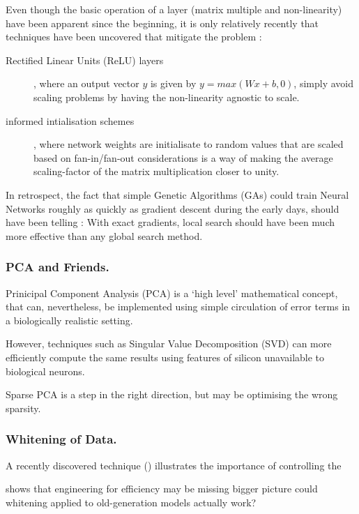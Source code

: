 \documentclass[citeauthoryear]{llncs}
\begin{document}
Even though the basic operation of a layer (matrix multiple and non-linearity) 
have been apparent since the beginning, it is only relatively recently that 
techniques have been uncovered that mitigate the problem : 
\begin{description}
\item[Rectified Linear Units (ReLU) layers] , where an output vector $y$ is given by $y=max(Wx+b, 0)$, simply 
avoid scaling problems by having the non-linearity agnostic to scale.
\item[informed intialisation schemes], where network weights are initialisate 
to random values that are scaled based on fan-in/fan-out considerations is a way of making the 
average scaling-factor of the matrix multiplication closer to unity.
\end{description}

In retrospect, the fact that simple Genetic Algorithms (GAs) could train 
Neural Networks roughly as quickly as gradient descent during the early days, 
should have been telling : With exact gradients, local search should have 
been much more effective than any global search method.


\subsubsection*{PCA and Friends.}

Prinicipal Component Analysis (PCA) is a `high level' mathematical concept, 
that can, nevertheless, be implemented using simple circulation of error terms
in a biologically realistic setting.

\cite{PCAnet results}

However, techniques such as Singular Value Decomposition (SVD) can more 
efficiently compute the same results using features of silicon unavailable to biological neurons.

Sparse PCA is a step in the right direction, but may be optimising the wrong sparsity.



\subsubsection*{Whitening of Data.}

A recently discovered technique (\cite{Whitening of Data}) illustrates 
the importance of controlling the 


    shows that engineering for efficiency may be missing bigger picture
    could whitening applied to old-generation models actually work?
\end{document}
